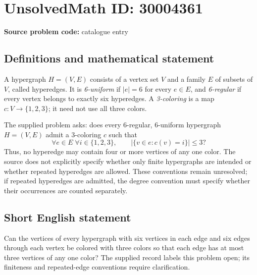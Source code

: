 \documentclass[11pt]{article}
\begin{document}
\section*{UnsolvedMath ID: 30004361}
\textbf{Source problem code:} catalogue entry
\subsection{Definitions and mathematical statement}
A hypergraph \(H=(V,E)\) consists of a vertex set \(V\) and a family \(E\) of subsets of \(V\), called hyperedges. It is \emph{6-uniform} if \(|e|=6\) for every \(e\in E\), and \emph{6-regular} if every vertex belongs to exactly six hyperedges. A \emph{3-coloring} is a map \(c:V\to\{1,2,3\}\); it need not use all three colors.

The supplied problem asks: does every 6-regular, 6-uniform hypergraph \(H=(V,E)\) admit a 3-coloring \(c\) such that
\[
\forall e\in E\;\forall i\in\{1,2,3\},\qquad
\bigl|\{v\in e:c(v)=i\}\bigr|\leq 3?
\]
Thus, no hyperedge may contain four or more vertices of any one color. The source does not explicitly specify whether only finite hypergraphs are intended or whether repeated hyperedges are allowed. These conventions remain unresolved; if repeated hyperedges are admitted, the degree convention must specify whether their occurrences are counted separately.
\subsection{Short English statement}
Can the vertices of every hypergraph with six vertices in each edge and six edges through each vertex be colored with three colors so that each edge has at most three vertices of any one color? The supplied record labels this problem open; its finiteness and repeated-edge conventions require clarification.
\end{document}
